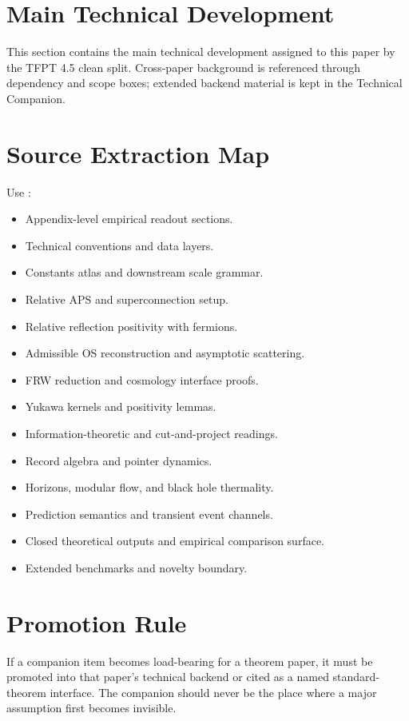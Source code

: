 \documentclass[11pt,a4paper]{article}
\begin{document}
\clearpage
\section{Main Technical Development}

This section contains the main technical development assigned to this paper by the TFPT 4.5 clean split. Cross-paper background is referenced through dependency and scope boxes; extended backend material is kept in the Technical Companion.



\section{Source Extraction Map}

\begin{tfptsourcebox}
Use \sourceDraft:
\begin{itemize}[leftmargin=1.5em]
    \item Appendix-level empirical readout sections.
    \item Technical conventions and data layers.
    \item Constants atlas and downstream scale grammar.
    \item Relative APS and superconnection setup.
    \item Relative reflection positivity with fermions.
    \item Admissible OS reconstruction and asymptotic scattering.
    \item FRW reduction and cosmology interface proofs.
    \item Yukawa kernels and positivity lemmas.
    \item Information-theoretic and cut-and-project readings.
    \item Record algebra and pointer dynamics.
    \item Horizons, modular flow, and black hole thermality.
    \item Prediction semantics and transient event channels.
    \item Closed theoretical outputs and empirical comparison surface.
    \item Extended benchmarks and novelty boundary.
\end{itemize}
\end{tfptsourcebox}

\section{Promotion Rule}

If a companion item becomes load-bearing for a theorem paper, it must be promoted into that paper's
technical backend or cited as a named standard-theorem interface. The companion should never be the
place where a major assumption first becomes invisible.
\end{document}
